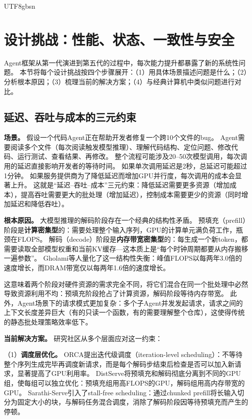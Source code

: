\documentclass[11pt,a4paper]{article}
\begin{document}
\begin{CJK*}{UTF8}{gbsn}
\section{设计挑战：性能、状态、一致性与安全}
\label{sec:challenges}

Agent框架从第一代演进到第五代的过程中，每次能力提升都暴露了新的系统性问题。
本节将每个设计挑战按四个步骤展开：（1）用具体场景描述问题是什么；（2）分析根本原因；（3）梳理当前的解决方案；（4）与经典计算机中类似问题进行对比。

\subsection{延迟、吞吐与成本的三元约束}

\textbf{场景。}
假设一个代码Agent正在帮助开发者修复一个跨10个文件的bug。
Agent需要阅读多个文件（每次阅读触发模型推理）、理解代码结构、定位问题、修改代码、运行测试、查看结果、再修改。
整个流程可能涉及20--50次模型调用，每次调用的延迟直接影响开发者的等待时间。
如果单次调用延迟是2秒，总延迟可能超过1分钟。
如果服务提供商为了降低延迟而增加GPU并行度，每次调用的成本会显著上升。
这就是``延迟--吞吐--成本''三元约束：降低延迟需要更多资源（增加成本），提高吞吐需要更大的批处理（增加延迟），控制成本需要更少的资源（同时增加延迟和降低吞吐）。

\textbf{根本原因。}
大模型推理的解码阶段存在一个经典的结构性矛盾。
预填充（prefill）阶段是\textbf{计算密集型}的：需要处理整个输入序列，GPU的计算单元满负荷工作，瓶颈在FLOPS。
解码（decode）阶段是\textbf{内存带宽密集型}的：每生成一个新token，都需要读取全部模型权重和当前KV缓存---这本质上是``每个时钟周期都要从内存搬移一遍参数''\cite{gholami2024memorywall}。
Gholami等人量化了这一结构性失衡：峰值FLOPS以每两年3.0倍的速度增长，而DRAM带宽仅以每两年1.6倍的速度增长\cite{gholami2024memorywall}。

这意味着两个阶段对硬件资源的需求完全不同，将它们混合在同一个批处理中必然导致资源利用不均：预填充阶段抢占了计算资源，解码阶段等待内存带宽。
此外，Agent场景下的请求模式更加复杂：多个子Agent并发发起请求，请求之间的上下文长度差异巨大（有的只读一个函数，有的需要理解整个仓库），这使得传统的静态批处理策略效率低下。

\textbf{当前解决方案。}
研究社区从多个层面应对这一约束：

（1）\textbf{调度层优化。}
ORCA\cite{orca2022}提出迭代级调度（iteration-level scheduling）：不等待整个序列生成完毕再调度新请求，而是每个解码步结束后检查是否可以加入新请求，显著提高了GPU利用率。
DistServe\cite{zhong2024distserve}将预填充和解码彻底分离到不同的GPU组，使每组可以独立优化：预填充组用高FLOPS的GPU，解码组用高内存带宽的GPU。
Sarathi-Serve\cite{agrawal2024sarathi}引入了stall-free scheduling：通过chunked prefill将长输入切分为固定大小的块，与解码任务混合调度，消除了解码阶段因等待预填充而产生的停顿。


\end{CJK*}
\end{document}
